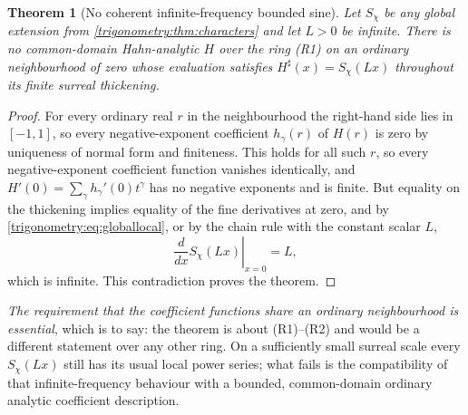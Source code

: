 \documentclass[11pt,letterpaper]{article}
\numberwithin{equation}{section}
\newtheorem{theorem}{Theorem}[section]
\theoremstyle{definition}
\theoremstyle{remark}
\newcommand{\sh}{^{\sharp}}
\begin{document}
\begin{theorem}[No coherent infinite-frequency bounded sine]
\label{trigonometry:thm:infinitefrequency}
Let $S_\chi$ be any global extension from \cref{trigonometry:thm:characters} and let $L>0$ be
infinite. There is \emph{no} common-domain Hahn-analytic $H$ over the ring (R1) on an ordinary
neighbourhood of zero whose evaluation satisfies $H\sh(x)=S_\chi(Lx)$ throughout its finite surreal
thickening.
\end{theorem}
\begin{proof}
For every ordinary real $r$ in the neighbourhood the right-hand side lies in $[-1,1]$, so every
negative-exponent coefficient $h_\gamma(r)$ of $H(r)$ is zero by uniqueness of normal form and
finiteness. This holds for all such $r$, so every negative-exponent coefficient function vanishes
identically, and $H'(0)=\sum_\gamma h_\gamma'(0)t^\gamma$ has no negative exponents and is finite.
But equality on the thickening implies equality of the fine derivatives at zero, and by
\cref{trigonometry:eq:globallocal}, or by the chain rule with the constant scalar $L$,
\[
 \left.\frac d{dx}S_\chi(Lx)\right|_{x=0}=L,
\]
which is infinite. This contradiction proves the theorem.
\end{proof}
\emph{The requirement that the coefficient functions share an ordinary neighbourhood is essential},
which is to say: the theorem is about (R1)--(R2) and would be a different statement over any other
ring. On a sufficiently small surreal scale every $S_\chi(Lx)$ still has its usual local power
series; what fails is the compatibility of that infinite-frequency behaviour with a bounded,
common-domain ordinary analytic coefficient description.
\end{document}
